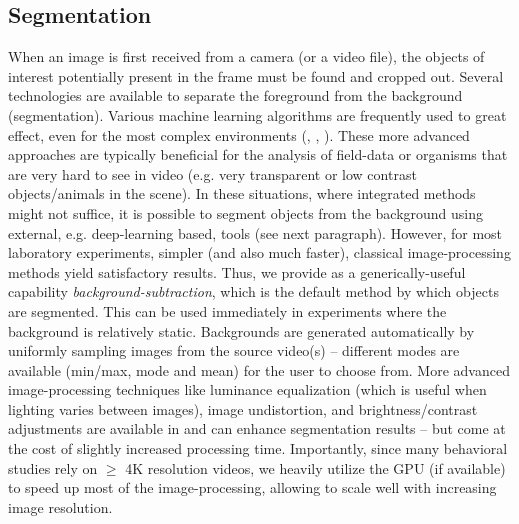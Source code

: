 \documentclass[9pt,lineno]{elife}
\newcommand{\TRex}{\protect\path{TRex}}
\newcommand{\TGrabs}{\protect\path{TGrabs}}
\newcommand{\changemade}[1]{#1}
\begin{document}
\subsection{Segmentation}

When an image is first received from a camera (or a video file), the objects of interest potentially present in the frame must be \changemade{found} and cropped out. Several technologies are available to separate the foreground from the background (segmentation). Various machine learning algorithms are frequently used to great effect, even for the most complex environments (\citealt{hughey2018challenges}, \citealt{robie2017machine}, \citealt{francisco2019low}). These more advanced approaches are typically beneficial for the analysis of field-data or organisms that are very hard to see in video (e.g. very transparent or low contrast objects/animals in the scene). \changemade{In these situations, where integrated methods might not suffice, it is possible to segment objects from the background using external, e.g. deep-learning based, tools (see next paragraph).} However, for most laboratory experiments, simpler (and also much faster), classical image-processing methods yield satisfactory results. \changemade{Thus, we provide as a generically-useful capability \emph{background-subtraction}, which is the default method by which objects are segmented. This can be used immediately in experiments where the background is relatively static. Backgrounds are generated automatically by uniformly sampling images from the source video(s) -- different modes are available (min/max, mode and mean) for the user to choose from. More advanced image-processing techniques like luminance equalization (which is useful when lighting varies between images), image undistortion, and brightness/contrast adjustments are available in \TGrabs{} and can enhance segmentation results -- but come at the cost of slightly increased processing time.} Importantly, since many behavioral studies rely on $\ge$ 4K resolution videos, we heavily utilize the GPU (if available) to speed up most of the image-processing, allowing \TRex{} to scale well with increasing image resolution.
\end{document}

